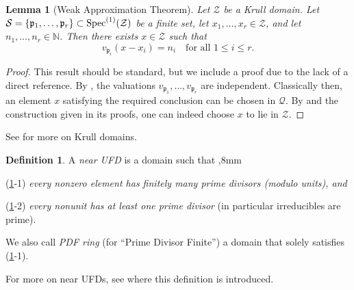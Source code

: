 \documentclass[11pt,a4paper,reqno]{amsart}
\def\N{\mathbb{N}}
\def\s1{{\rm Spec}^{(1)}}
\newtheorem{lem}[thm]{Lemma}
\theoremstyle{definition}
\newtheorem{defn}[thm]{Definition}
\begin{document}
\begin{lem}[Weak Approximation Theorem]\label{lem:weakappro}
Let ${\mathcal Z}$ be a Krull domain. Let $\mathcal{S}=\{\mathfrak{p}_1,\dots,\mathfrak{p}_r\} \subset \s1(\mathcal{Z})$ be a finite set, let $x_1,\dots,x_r \in \mathcal{Z}$, and let $n_1,\dots,n_r \in \N$. Then there exists $x \in \mathcal{Z}$ such that
$$
v_{\mathfrak{p}_i}(x-x_i)=n_i\quad \textrm{for all } 1 \leq i \leq r.
$$ 
\end{lem}

\begin{proof}
This result should be standard, but we include a proof due to the lack of a direct reference. By \cite[Page 289, V)]{Mat80}, the valuations $v_{\mathfrak{p}_1},\dots,v_{\mathfrak{p}_r}$ are independent. Classically then, an element $x$ satisfying the required conclusion can be chosen in $\mathcal{Q}$.  By \cite[Proposition 4.4]{Jar91} and the construction given in its proofs, one can indeed choose $x$ to lie in $\mathcal{Z}$. 
\end{proof}

See \cite[Section 41, Chapter 13]{Mat80} for more on Krull domains.


\begin{defn} \label{def:near-UFD}
A \emph{near UFD} is a domain such that 
,8mm

\noindent
(\ref{def:near-UFD}-1) \emph{every nonzero element has finitely many prime divisors (modulo units), and} 
\vskip 1mm

\noindent
(\ref{def:near-UFD}-2) \emph{every nonunit has at least one prime divisor} (in particular irreducibles are prime).
\vskip 1mm

\noindent
We also call \emph{PDF ring} (for ``Prime Divisor Finite'') a domain
that solely satisfies (\ref{def:near-UFD}-1).
\end{defn}

For more on near UFDs, see \cite[\S 2.3]{BDKN22} where this definition is introduced. 

\end{document}
